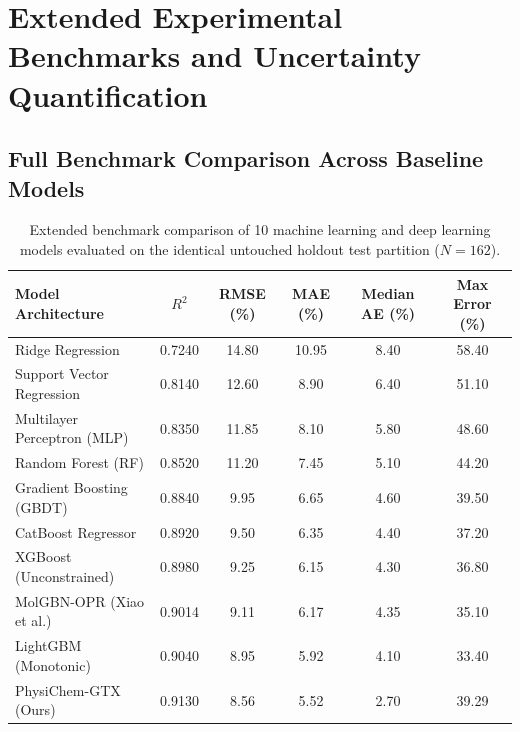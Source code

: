 \documentclass[11pt]{article}
\begin{document}
\clearpage

\section{Extended Experimental Benchmarks and Uncertainty Quantification}
\label{sec:benchmarks}

\subsection{Full Benchmark Comparison Across Baseline Models}

\begin{table}[H]
\centering
\small
\setlength{\tabcolsep}{5pt}
\caption{Extended benchmark comparison of 10 machine learning and deep learning models evaluated on the identical untouched holdout test partition ($N = 162$).}
\label{tab:s6_full_benchmarks}
\begin{tabular}{lccccc}
\toprule
Model Architecture & $R^2$ & RMSE (\%) & MAE (\%) & Median AE (\%) & Max Error (\%) \\
\midrule
Ridge Regression            & 0.7240 & 14.80 & 10.95 & 8.40 & 58.40 \\
Support Vector Regression   & 0.8140 & 12.60 &  8.90 & 6.40 & 51.10 \\
Multilayer Perceptron (MLP) & 0.8350 & 11.85 &  8.10 & 5.80 & 48.60 \\
Random Forest (RF)          & 0.8520 & 11.20 &  7.45 & 5.10 & 44.20 \\
Gradient Boosting (GBDT)    & 0.8840 &  9.95 &  6.65 & 4.60 & 39.50 \\
CatBoost Regressor          & 0.8920 &  9.50 &  6.35 & 4.40 & 37.20 \\
XGBoost (Unconstrained)     & 0.8980 &  9.25 &  6.15 & 4.30 & 36.80 \\
MolGBN-OPR (Xiao et al.)    & 0.9014 &  9.11 &  6.17 & 4.35 & 35.10 \\
LightGBM (Monotonic)        & 0.9040 &  8.95 &  5.92 & 4.10 & 33.40 \\
PhysiChem-GTX (Ours) & 0.9130 & 8.56 & 5.52 & 2.70 & 39.29 \\
\bottomrule
\end{tabular}
\end{table}
\end{document}
